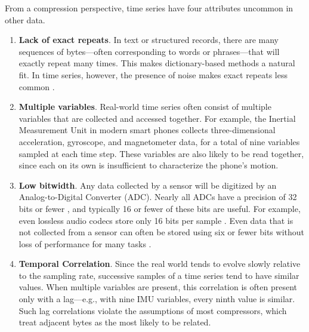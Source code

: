 
From a compression perspective, time series have four attributes uncommon in other data.

\begin{enumerate}
    \item \textbf{Lack of exact repeats}. In text or structured records, there are many sequences of bytes---often corresponding to words or phrases---that will exactly repeat many times. This makes dictionary-based methods a natural fit. In time series, however, the presence of noise makes exact repeats less common \cite{extract, epenthesis}.
    \item \textbf{Multiple variables}. Real-world time series often consist of multiple variables that are collected and accessed together. For example, the Inertial Measurement Unit in modern smart phones collects three-dimensional acceleration, gyroscope, and magnetometer data, for a total of nine variables sampled at each time step. These variables are also likely to be read together, since each on its own is insufficient to characterize the phone's motion. %
    \item \textbf{Low bitwidth}. Any data collected by a sensor will be digitized by an Analog-to-Digital Converter (ADC). Nearly all ADCs have a precision of 32 bits or fewer \cite{digikeyADCs}, and typically 16 or fewer of these bits are useful. For example, even lossless audio codecs store only 16 bits per sample \cite{flac, shorten}. Even data that is not collected from a sensor can often be stored using six or fewer bits without loss of performance for many tasks \cite{epenthesis, mdlIntrinsic, SAX}.
    \item \textbf{Temporal Correlation}. Since the real world tends to evolve slowly relative to the sampling rate, successive samples of a time series tend to have similar values. When multiple variables are present, this correlation is often present only with a lag---e.g., with nine IMU variables, every ninth value is similar. Such lag correlations violate the assumptions of most compressors, which treat adjacent bytes as the most likely to be related.
\end{enumerate}

